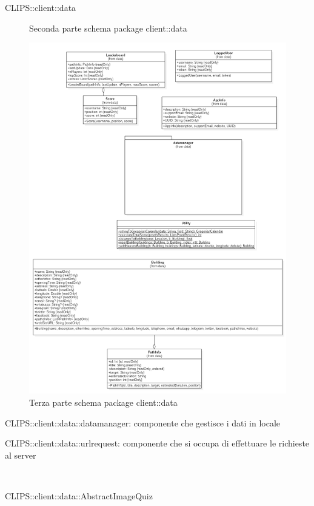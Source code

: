 \begin{componente}{CLIPS::client::data}
\begin{figure}[h!]
 \caption{Seconda parte schema package client::data}
\end{figure}
\begin{figure}[h!]
 \centering
 \includegraphics[scale=0.4]{img/package/png/client--data3.png}
 \caption{Terza parte schema package client::data}
\end{figure}
\begin{compPackageContenuti}
\item CLIPS::client::data::datamanager: componente che gestisce i dati in locale
\item CLIPS::client::data::urlrequest: componente che si occupa di effettuare le richieste al server
\end{compPackageContenuti}
\begin{compClassi} \\
\begin{classe}{CLIPS::client::data::AbstractImageQuiz}

\end{classe}
\end{compClassi}
\end{componente}
